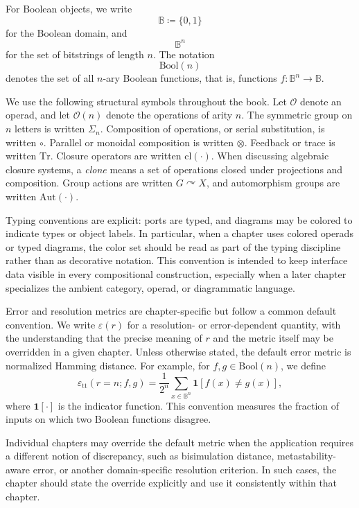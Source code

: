 \documentclass[11pt]{article}
\begin{document}
For Boolean objects, we write
\[
\mathbb{B} \coloneqq \{0,1\}
\]
for the Boolean domain, and
\[
\mathbb{B}^n
\]
for the set of bitstrings of length $n$. The notation
\[
\mathrm{Bool}(n)
\]
denotes the set of all $n$-ary Boolean functions, that is, functions $f : \mathbb{B}^n \to \mathbb{B}$.

We use the following structural symbols throughout the book. Let $\mathcal{O}$ denote an operad, and let $\mathcal{O}(n)$ denote the operations of arity $n$. The symmetric group on $n$ letters is written $\Sigma_n$. Composition of operations, or serial substitution, is written $\circ$. Parallel or monoidal composition is written $\otimes$. Feedback or trace is written $\mathrm{Tr}$. Closure operators are written $\mathrm{cl}(\cdot)$. When discussing algebraic closure systems, a \emph{clone} means a set of operations closed under projections and composition. Group actions are written $G \curvearrowright X$, and automorphism groups are written $\mathrm{Aut}(\cdot)$.

Typing conventions are explicit: ports are typed, and diagrams may be colored to indicate types or object labels. In particular, when a chapter uses colored operads or typed diagrams, the color set should be read as part of the typing discipline rather than as decorative notation. This convention is intended to keep interface data visible in every compositional construction, especially when a later chapter specializes the ambient category, operad, or diagrammatic language.

Error and resolution metrics are chapter-specific but follow a common default convention. We write $\varepsilon(r)$ for a resolution- or error-dependent quantity, with the understanding that the precise meaning of $r$ and the metric itself may be overridden in a given chapter. Unless otherwise stated, the default error metric is normalized Hamming distance. For example, for $f,g \in \mathrm{Bool}(n)$, we define
\[
\varepsilon_{\mathrm{tt}}(r=n; f,g) = \frac{1}{2^n} \sum_{x \in \mathbb{B}^n} \mathbf{1}[f(x) \neq g(x)] ,
\]
where $\mathbf{1}[\cdot]$ is the indicator function. This convention measures the fraction of inputs on which two Boolean functions disagree.

Individual chapters may override the default metric when the application requires a different notion of discrepancy, such as bisimulation distance, metastability-aware error, or another domain-specific resolution criterion. In such cases, the chapter should state the override explicitly and use it consistently within that chapter.
\end{document}
